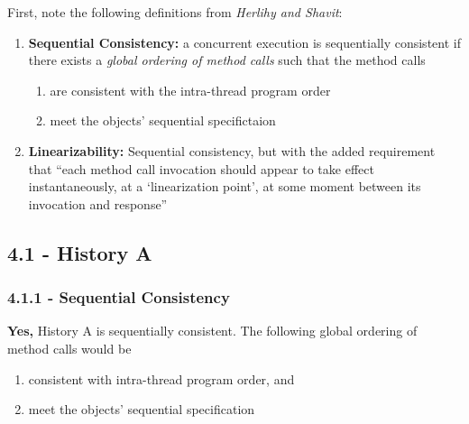 \documentclass[11pt, letterpaper]{article}
\begin{document}
First, note the following definitions from \textit{Herlihy and Shavit}:
\begin{enumerate}
    \item \textbf{Sequential Consistency:} a concurrent execution is sequentially consistent if there exists a \textit{global ordering of method calls} such that the method calls
    \begin{enumerate}
        \item are consistent with the intra-thread program order
        \item meet the objects' sequential specifictaion
    \end{enumerate}
    \item \textbf{Linearizability:} Sequential consistency, but with the added requirement that ``each method call invocation should appear to take effect instantaneously, at a `linearization point', at some moment between its invocation and response''
\end{enumerate}

\subsection*{4.1 - History A}
\label{sub:4_1}

\subsubsection*{4.1.1 - Sequential Consistency}
\label{ssub:4_1_1_sequential_consistency}

\textbf{Yes,} History A is sequentially consistent. The following global ordering of method calls would be
\begin{enumerate}
    \item consistent with intra-thread program order, and
    \item meet the objects' sequential specification
\end{enumerate}
\end{document}
